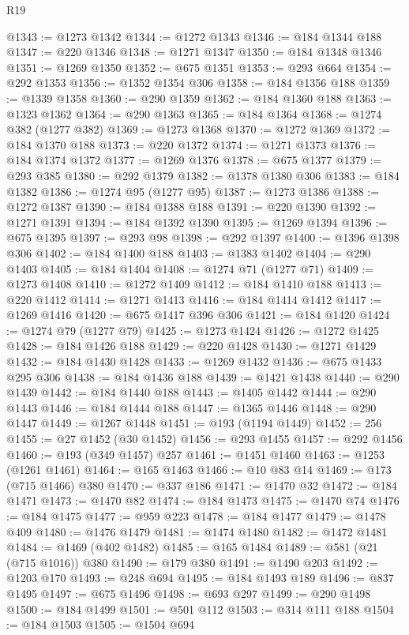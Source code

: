 \begin{lexlean}{R19}
\begin{coremodule}
@1343 := @1273 @1342
@1344 := @1272 @1343
@1346 := @184 @1344 @188
@1347 := @220 @1346
@1348 := @1271 @1347
@1350 := @184 @1348 @1346
@1351 := @1269 @1350
@1352 := @675 @1351
@1353 := @293 @664
@1354 := @292 @1353
@1356 := @1352 @1354 @306
@1358 := @184 @1356 @188
@1359 := @1339 @1358
@1360 := @290 @1359
@1362 := @184 @1360 @188
@1363 := @1323 @1362
@1364 := @290 @1363
@1365 := @184 @1364
@1368 := @1274 @382 (@1277 @382)
@1369 := @1273 @1368
@1370 := @1272 @1369
@1372 := @184 @1370 @188
@1373 := @220 @1372
@1374 := @1271 @1373
@1376 := @184 @1374 @1372
@1377 := @1269 @1376
@1378 := @675 @1377
@1379 := @293 @385
@1380 := @292 @1379
@1382 := @1378 @1380 @306
@1383 := @184 @1382
@1386 := @1274 @95 (@1277 @95)
@1387 := @1273 @1386
@1388 := @1272 @1387
@1390 := @184 @1388 @188
@1391 := @220 @1390
@1392 := @1271 @1391
@1394 := @184 @1392 @1390
@1395 := @1269 @1394
@1396 := @675 @1395
@1397 := @293 @98
@1398 := @292 @1397
@1400 := @1396 @1398 @306
@1402 := @184 @1400 @188
@1403 := @1383 @1402
@1404 := @290 @1403
@1405 := @184 @1404
@1408 := @1274 @71 (@1277 @71)
@1409 := @1273 @1408
@1410 := @1272 @1409
@1412 := @184 @1410 @188
@1413 := @220 @1412
@1414 := @1271 @1413
@1416 := @184 @1414 @1412
@1417 := @1269 @1416
@1420 := @675 @1417 @396 @306
@1421 := @184 @1420
@1424 := @1274 @79 (@1277 @79)
@1425 := @1273 @1424
@1426 := @1272 @1425
@1428 := @184 @1426 @188
@1429 := @220 @1428
@1430 := @1271 @1429
@1432 := @184 @1430 @1428
@1433 := @1269 @1432
@1436 := @675 @1433 @295 @306
@1438 := @184 @1436 @188
@1439 := @1421 @1438
@1440 := @290 @1439
@1442 := @184 @1440 @188
@1443 := @1405 @1442
@1444 := @290 @1443
@1446 := @184 @1444 @188
@1447 := @1365 @1446
@1448 := @290 @1447
@1449 := @1267 @1448
@1451 := @193 (@1194 @1449)
@1452 := 256
@1455 := @27 @1452 (@30 @1452)
@1456 := @293 @1455
@1457 := @292 @1456
@1460 := @193 (@349 @1457) @257
@1461 := @1451 @1460
@1463 := @1253 (@1261 @1461)
@1464 := @165 @1463
@1466 := @10 @83 @14
@1469 := @173 (@715 @1466) @380
@1470 := @337 @186
@1471 := @1470 @32
@1472 := @184 @1471
@1473 := @1470 @82
@1474 := @184 @1473
@1475 := @1470 @74
@1476 := @184 @1475
@1477 := @959 @223
@1478 := @184 @1477
@1479 := @1478 @409
@1480 := @1476 @1479
@1481 := @1474 @1480
@1482 := @1472 @1481
@1484 := @1469 (@402 @1482)
@1485 := @165 @1484
@1489 := @581 (@21 (@715 @1016)) @380
@1490 := @179 @380
@1491 := @1490 @203
@1492 := @1203 @170
@1493 := @248 @694
@1495 := @184 @1493 @189
@1496 := @837 @1495
@1497 := @675 @1496
@1498 := @693 @297
@1499 := @290 @1498
@1500 := @184 @1499
@1501 := @501 @112
@1503 := @314 @111 @188
@1504 := @184 @1503
@1505 := @1504 @694

\end{coremodule}
\end{lexlean}
